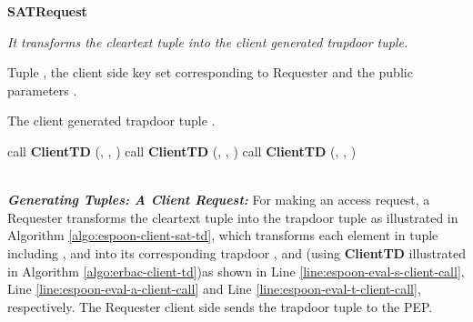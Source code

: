 \documentclass[epsfig,a4paper,11pt,titlepage]{book}
\numberwithin{algorithm}{chapter}
\newcommand{\algofontsize}{\fontsize{11}{12}\selectfont}
\begin{document}
\begin{algorithm} [htp]
{\algofontsize
\caption{\textbf{SATRequest}}

\label{algo:espoon-client-sat-td}

\begin{algorithmic}[1]

\INPUT \emph{It transforms the cleartext tuple into the client generated trapdoor tuple.}

\Require Tuple , the client side key set  corresponding to Requester  and the public parameters .

\Ensure The client generated trapdoor tuple .

\medskip

\State  call \textbf{ClientTD} (, , ) \label{line:espoon-eval-s-client-call}
\State  call \textbf{ClientTD} (, , ) \label{line:espoon-eval-a-client-call}
\State  call \textbf{ClientTD} (, , ) \label{line:espoon-eval-t-client-call}

\State  \label{line:espoon-eval-sat-client-assignment}

\Return 

\end{algorithmic}
}
\end{algorithm}
\noindent \\
\noindent \emph{\textbf{Generating Tuples: A Client Request:}}
For making an access request, a Requester transforms the cleartext tuple into the trapdoor tuple as illustrated in Algorithm \ref{algo:espoon-client-sat-td}, which transforms each element in tuple including ,  and  into its corresponding trapdoor ,  and  (using \textbf{ClientTD} illustrated in Algorithm \ref{algo:erbac-client-td})as shown in Line \ref{line:espoon-eval-s-client-call}, Line \ref{line:espoon-eval-a-client-call} and Line \ref{line:espoon-eval-t-client-call}, respectively. The Requester client side sends the trapdoor tuple to the \gls{PEP}.
\end{document}
